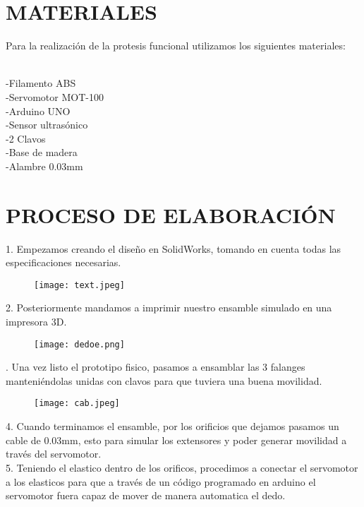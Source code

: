 \documentclass{article}
\begin{document}
\section{MATERIALES}
Para la realización de la protesis funcional utilizamos los siguientes materiales:

\\-Filamento ABS
\\-Servomotor MOT-100
\\-Arduino UNO
\\-Sensor ultrasónico
\\-2 Clavos
\\-Base de madera
\\-Alambre 0.03mm

\newpage

\section{PROCESO DE ELABORACIÓN}

1. Empezamos creando el diseño en SolidWorks, tomando en cuenta todas las especificaciones necesarias.

\begin{figure} [H]%
    \centering
    \texttt{[image: text.jpeg]} %
    \label{grafica}
\end{figure}

2. Posteriormente mandamos a imprimir nuestro ensamble simulado en una impresora 3D.

\begin{figure} [H]%
    \centering
    \texttt{[image: dedoe.png]} %
    \label{grafica}
\end{figure}
. Una vez listo el prototipo fisico, pasamos a ensamblar las 3 falanges manteniéndolas unidas con clavos para que tuviera una buena movilidad.

\begin{figure} [H]%
    \centering
    \texttt{[image: cab.jpeg]} %
    \label{grafica}
\end{figure}

4. Cuando terminamos el ensamble, por los orificios que dejamos pasamos un cable de 0.03mm, esto para simular los extensores y poder generar movilidad a través del servomotor.\\

5. Teniendo el elastico dentro de los orificos, procedimos a conectar el servomotor a los elasticos para que a través de un código programado en arduino el servomotor fuera capaz de mover de manera automatica el dedo.
\end{document}
